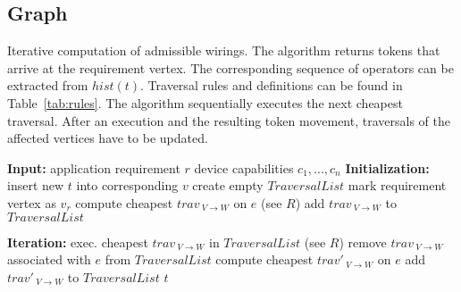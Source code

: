 \documentclass[twoside,twocolumn,10pt]{article}
\begin{document}
%
%
%
%
%
%
%
%
%
%
%
%
%
%
%
%
%




%
%
\subsection{Graph} \label{graph}









%
\begin{algorithm}[t]
\caption{Iterative computation of admissible wirings. The algorithm returns tokens that arrive at the requirement vertex. The corresponding sequence of operators can be extracted from $hist(t)$. Traversal rules and definitions can be found in Table~\ref{tab:rules}. The algorithm sequentially executes the next cheapest traversal. After an execution and the resulting token movement, traversals of the affected vertices have to be updated.}
\label{alg:algo}
\begin{algorithmic}
\STATE \textbf{Input:}
\STATE application requirement $r$
\STATE device capabilities $c_1, ..., c_n$
\STATE
\STATE \textbf{Initialization:}
\STATE insert new $t$ into corresponding $v$
\ENDFOR
\STATE create empty $TraversalList$
\STATE mark requirement vertex as $v_r$
\STATE compute cheapest $trav_{~V \rightarrow W}$ on $e$ (see $R$)
\STATE add $trav_{~V \rightarrow W}$ to $TraversalList$
\ENDFOR
\STATE

\STATE \textbf{Iteration:}
\REPEAT
\STATE exec. cheapest $trav_{~V \rightarrow W}$ in $TraversalList$ (see $R$)
\STATE remove $trav_{~V \rightarrow W}$ associated with $e$ from $TraversalList$
\STATE compute cheapest $trav'_{~V \rightarrow W}$ on $e$
\STATE add $trav'_{~V \rightarrow W}$ to $TraversalList$
\ENDFOR
\ENDFOR
{}
\RETURN $t$
\end{algorithmic}
\end{algorithm}
\end{document}
